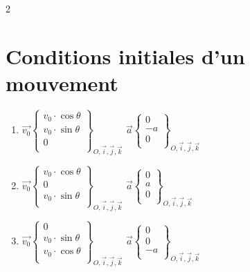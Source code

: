 \documentclass[a4paper,11pt,fleqn]{article}%
\begin{document}
\begin{multicols}{2}
\section{Conditions initiales d'un mouvement}
 \begin{enumerate}
	\item $\vec{v_0} \left\lbrace \begin{array}{c}
	v_0\cdot \cos{\theta}\\
	v_0\cdot \sin{\theta}\\
	0\\
	\end{array} \right\rbrace_{O,\vec{i},\vec{j},\vec{k}}$
	$\vec{a} \left\lbrace \begin{array}{c}
	0\\
	-a\\
	0\\
	\end{array} \right\rbrace_{O,\vec{i},\vec{j},\vec{k}}$
	\item $\vec{v_0} \left\lbrace \begin{array}{c}
	v_0\cdot \cos{\theta}\\
	0\\
	v_0\cdot \sin{\theta}\\
	\end{array} \right\rbrace_{O,\vec{i},\vec{j},\vec{k}}$
	$\vec{a} \left\lbrace \begin{array}{c}
	0\\
	a\\
	0\\
	\end{array} \right\rbrace_{O,\vec{i},\vec{j},\vec{k}}$
	\item $\vec{v_0} \left\lbrace \begin{array}{c}
		0\\
		v_0\cdot \sin{\theta}\\
		v_0\cdot \cos{\theta}\\
		\end{array} \right\rbrace_{O,\vec{i},\vec{j},\vec{k}}$
		$\vec{a} \left\lbrace \begin{array}{c}
		0\\
		0\\
		-a\\
		\end{array} \right\rbrace_{O,\vec{i},\vec{j},\vec{k}}$

 \end{enumerate}


\end{multicols}
\end{document}
